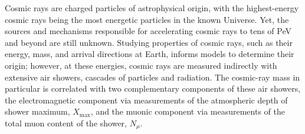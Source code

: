 






Cosmic rays are charged particles of astrophysical origin, with the highest-energy cosmic rays being the most energetic particles in the known Universe.
Yet, the sources and mechanisms responsible for accelerating cosmic rays to tens of PeV and beyond are still unknown.
Studying properties of cosmic rays, such as their energy, mass, and arrival directions at Earth, informs models to determine their origin; however, at these energies, cosmic rays are measured indirectly with extensive air showers, cascades of particles and radiation.
The cosmic-ray mass in particular is correlated with two complementary components of these air showers, the electromagnetic component via measurements of the atmospheric depth of shower maximum, $X_{\text{max}}$, and the muonic component via measurements of the total muon content of the shower, $N_{\mu}$.

